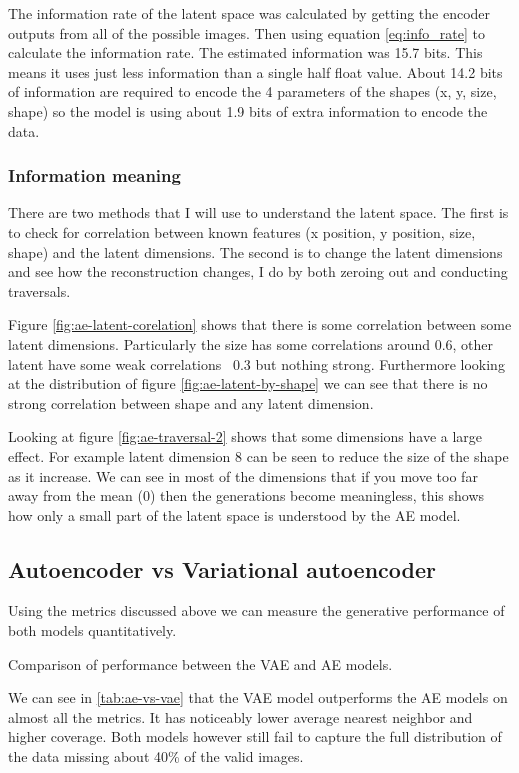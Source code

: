 \documentclass[conference,a4paper]{IEEEtran}
\newcommand{\centertable}[2]{
    \begin{table}[htbp]
        \centering
        \caption{#2}
        
        \label{tab:#1}
    \end{table}
}
\begin{document}
The information rate of the latent space was calculated by getting the encoder outputs from all of the possible images. Then using equation \ref{eq:info_rate} to calculate the information rate. The estimated information was 15.7 bits. This means it uses just less information than a single half float value. About 14.2 bits of information are required to encode the 4 parameters of the shapes (x, y, size, shape) so the model is using about 1.9 bits of extra information to encode the data.

\subsubsection{Information meaning}

There are two methods that I will use to understand the latent space. The first is to check for correlation between known features (x position, y position, size, shape) and the latent dimensions. The second is to change the latent dimensions and see how the reconstruction changes, I do by both zeroing out and conducting traversals.

Figure \ref{fig:ae-latent-corelation} shows that there is some correlation between some latent dimensions. Particularly the size has some correlations around 0.6, other latent have some weak correlations ~0.3 but nothing strong. Furthermore looking at the distribution of figure \ref{fig:ae-latent-by-shape} we can see that there is no strong correlation between shape and any latent dimension.

Looking at figure \ref{fig:ae-traversal-2} shows that some dimensions have a large effect. For example latent dimension 8 can be seen to reduce the size of the shape as it increase. We can see in most of the dimensions that if you move too far away from the mean (0) then the generations become meaningless, this shows how only a small part of the latent space is understood by the AE model.

\subsection{Autoencoder vs Variational autoencoder}

Using the metrics discussed above we can measure the generative performance of both models quantitatively.

\centertable{ae-vs-vae}{Comparison of performance between the VAE and AE models.}

We can see in \ref{tab:ae-vs-vae} that the VAE model outperforms the AE models on almost all the metrics. It has noticeably lower average nearest neighbor and higher coverage. Both models however still fail to capture the full distribution of the data missing about 40\% of the valid images.
\end{document}
